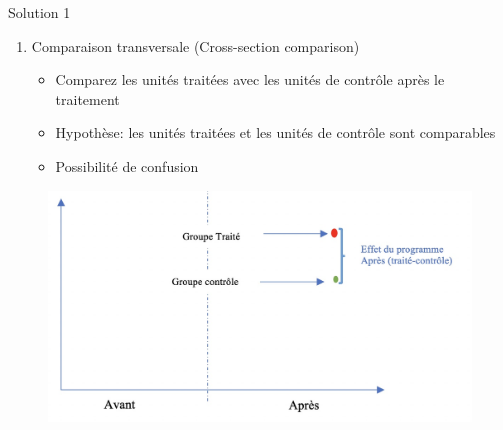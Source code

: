 \documentclass[ignorenonframetext,]{beamer}
\providecommand{\tightlist}{%
  \setlength{\itemsep}{0pt}\setlength{\parskip}{0pt}}
\begin{document}
\begin{frame}{Solution 1}
\protect\hypertarget{solution-1}{}

\begin{enumerate}
\tightlist
\item
  Comparaison transversale (Cross-section comparison)

  \begin{itemize}
  \tightlist
  \item
    Comparez les unités traitées avec les unités de contrôle après le
    traitement
  \item
    Hypothèse: les unités traitées et les unités de contrôle sont
    comparables
  \item
    Possibilité de confusion
  \end{itemize}
\end{enumerate}

\begin{figure}
\includegraphics[width=0.8\linewidth]{cross_sectional} \end{figure}

\end{frame}
\end{document}
